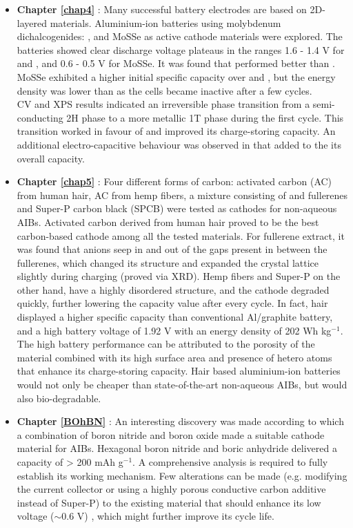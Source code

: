 \begin{itemize}

\item \textbf{Chapter \ref{chap4}} : Many successful battery electrodes are based on 2D-layered materials. Aluminium-ion batteries using molybdenum dichalcogenides: ,  and MoSSe as active cathode materials were explored. The batteries showed clear discharge voltage plateaus in the ranges 1.6 - 1.4 V for  and , and 0.6 - 0.5 V for MoSSe. It was found that  performed better than . MoSSe exhibited a higher initial specific capacity over  and , but the energy density was lower than  as the cells became inactive after a few cycles.  \\
CV and XPS results indicated an irreversible phase transition from a semi-conducting 2H phase to a more metallic 1T phase during the first cycle. This transition worked in favour of  and improved its charge-storing capacity. An additional electro-capacitive behaviour was observed in  that added to the its overall capacity.

\item \textbf{Chapter \ref{chap5}} : Four different forms of carbon: activated carbon (AC) from human hair, AC from hemp fibers, a mixture consisting of  and  fullerenes and Super-P carbon black (SPCB) were tested as cathodes for non-aqueous AIBs. Activated carbon derived from human hair proved to be the best carbon-based cathode among all the tested materials. For fullerene extract, it was found that  anions seep in and out of the gaps present in between the fullerenes, which changed its structure and expanded the crystal lattice slightly during charging (proved via XRD). Hemp fibers and Super-P on the other hand, have a highly disordered structure, and the cathode degraded quickly, further lowering the capacity value after every cycle. In fact, hair displayed a higher specific capacity than conventional Al/graphite battery, and a high battery voltage of 1.92 V with an energy density of 202 Wh kg$^{-1}$. The high battery performance can be attributed to the porosity of the material combined with its high surface area and presence of hetero atoms that enhance its charge-storing capacity. Hair based aluminium-ion batteries would not only be cheaper than state-of-the-art non-aqueous AIBs, but would also bio-degradable.

\item \textbf{Chapter \ref{BOhBN}} : An interesting discovery was made according to which a combination of boron nitride and boron oxide made a suitable cathode material for AIBs. Hexagonal boron nitride and boric anhydride delivered a capacity of > 200 mAh g$^{-1}$. A comprehensive analysis is required to fully establish its working mechanism. Few alterations can be made (e.g. modifying the current collector or using a highly porous conductive carbon additive instead of Super-P) to the existing material that should enhance its low voltage ($\sim$0.6 V) , which might further improve its cycle life. 
\end{itemize}

